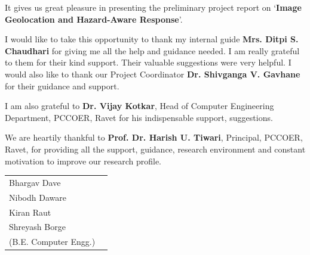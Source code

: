 {   \setlength{\parindent}{11mm} }
{ \setlength{\parindent}{0mm} }

It gives us great pleasure in presenting the preliminary project report on `{\bfseries Image Geolocation and Hazard-Aware Response}'.
\vspace*{1\baselineskip}

I would like to take this opportunity to thank my internal guide {\bfseries Mrs. Ditpi S. Chaudhari} for giving me all the help and guidance needed. I am really grateful to them for their kind support. Their valuable suggestions were very helpful. I would also like to thank our Project Coordinator {\bfseries Dr. Shivganga V. Gavhane} for their guidance and support.
\vspace*{1\baselineskip}

I am also grateful to {\bfseries Dr. Vijay Kotkar}, Head of Computer Engineering Department, PCCOER, Ravet for his indispensable support, suggestions.
\vspace*{1\baselineskip}

We are heartily thankful to {\bfseries Prof. Dr. Harish U. Tiwari}, Principal, PCCOER, Ravet, for providing all the support, guidance, research environment and constant motivation to improve our research profile.
\vspace*{3\baselineskip} \\
\begin{tabular}{p{8.2cm}c}
Bhargav Dave\\
Nibodh Daware\\
Kiran Raut\\
Shreyash Borge\\
(B.E. Computer Engg.)
\end{tabular}
